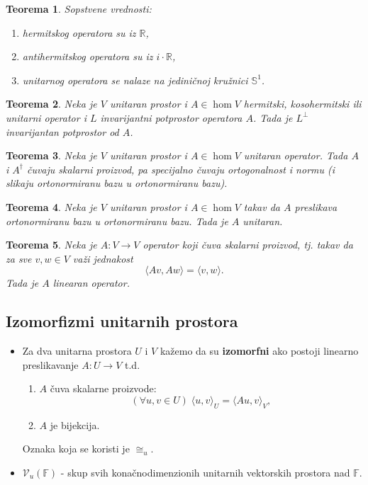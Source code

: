 \documentclass[a4paper,12pt,twoside]{report}
\newtheorem{theorem}{Teorema}[section]
\numberwithin{algorithm}{section}
\begin{document}
\begin{theorem}
    Sopstvene vrednosti:
    \begin{enumerate}
        \item hermitskog operatora su iz $\mathbb{R}$,
        \item antihermitskog operatora su iz \;$i \cdot\mathbb{R}$,
        \item unitarnog operatora se nalaze na jediničnoj kružnici $\mathbb{S}^1$.
    \end{enumerate}
\end{theorem}

\begin{theorem}
    Neka je $V$ unitaran prostor i $A \in \hom V$ hermitski, kosohermitski ili unitarni operator i $L$ invarijantni potprostor
    operatora $A$. Tada je $L^\perp$ invarijantan potprostor od $A$.
\end{theorem}

\begin{theorem}
    Neka je $V$ unitaran prostor i $A \in \hom V$ unitaran operator. Tada $A$ i $A^\dagger$ čuvaju skalarni proizvod, pa
    specijalno čuvaju ortogonalnost i normu (i slikaju ortonormiranu bazu u ortonormiranu bazu).
\end{theorem}

\begin{theorem}
    Neka je $V$ unitaran prostor i $A \in \hom V$ takav da $A$ preslikava ortonormiranu bazu u ortonormiranu bazu. Tada je $A$ unitaran.
\end{theorem}

\begin{theorem}
    Neka je $A:V \to V$ operator koji čuva skalarni proizvod, tj. takav da za sve $v, w \in V$ važi jednakost 
    \[ \langle Av, Aw \rangle = \langle v, w \rangle. \] Tada je $A$ linearan operator.
\end{theorem}

\subsection{Izomorfizmi unitarnih prostora}
\begin{itemize}
    \item Za dva unitarna prostora $U$ i $V$ kažemo da su \textbf{izomorfni} ako postoji linearno preslikavanje $A:U \to V$ t.d.
    \begin{enumerate}
        \item $A$ čuva skalarne proizvode:
        \[ (\forall u,v \in U) \; \langle u, v \rangle_U = \langle Au, v \rangle_V, \]
        \item $A$ je bijekcija.
    \end{enumerate}
    Oznaka koja se koristi je $\cong_u$.
    \item $\mathcal{V}_u(\mathbb{F})$ - skup svih konačnodimenzionih unitarnih vektorskih prostora nad $\mathbb{F}$.
\end{itemize}
\end{document}
